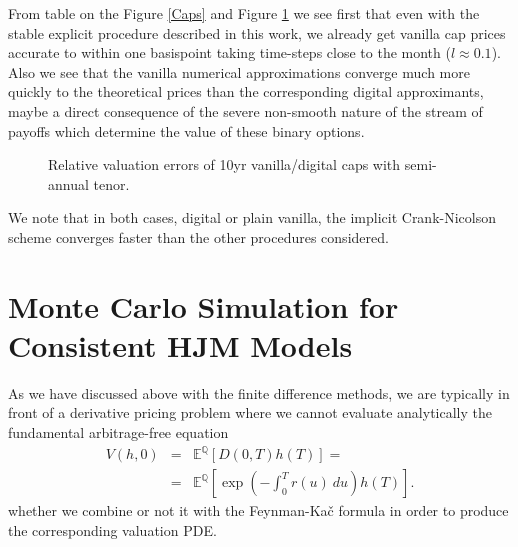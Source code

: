 From table on the Figure \ref{Caps} and Figure \ref{EuropeanCaps} we
see first that even with the stable explicit procedure described in
this work, we already get vanilla cap prices accurate to within one
basispoint taking time-steps close to the month ($l \approx 0.1$). Also
we see that the vanilla numerical approximations converge much more
quickly to the theoretical prices than the corresponding digital
approximants, maybe a direct consequence of the severe non-smooth
nature of the stream of payoffs which determine the value of these
binary options. \begin{figure}[h!]
\centering
\caption{Relative valuation errors of 10yr vanilla/digital caps with semi-annual
  tenor.\label{EuropeanCaps}} 
\begin{minipage}[l]{7cm}
\end{minipage}
\begin{minipage}[r]{7cm}
\end{minipage}
\end{figure}

We note that in both cases, digital or plain vanilla, the implicit
Crank-Nicolson scheme converges faster than the other procedures
considered.  

\section{Monte Carlo Simulation for Consistent HJM Models}
As we have discussed above with the finite difference methods, we are
typically in front of a derivative pricing problem where we cannot
evaluate analytically the fundamental arbitrage-free
equation 
\begin{eqnarray}
\nonumber
V(h,0) & = & \mathbb{E}^\mathbb{Q} \left[ D(0,T) h(T) \right] =\\
& = & \mathbb{E}^\mathbb{Q} \left[ \exp \left( - \int_0^T
    r(u)\: du \right) h(T) \right].
\end{eqnarray}
whether we combine or not it with the Feynman-Ka\v c formula in order
to produce the corresponding valuation PDE. 


